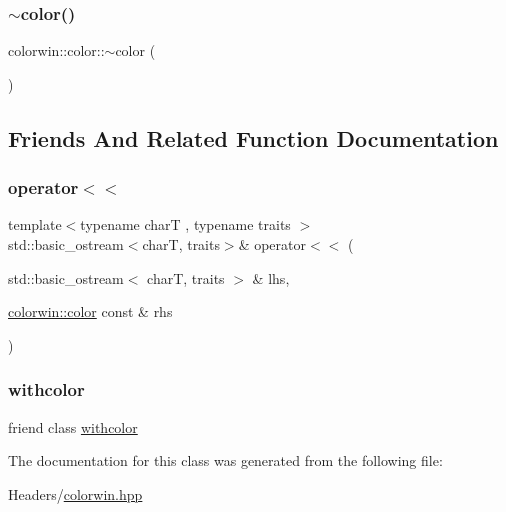 \mbox{\label{classcolorwin_1_1color_aae17b4c7bf1c06bb5045a4eedc6c8301}} 
\subsubsection{\texorpdfstring{$\sim$color()}{~color()}}
{\footnotesize\ttfamily colorwin\+::color\+::$\sim$color (\begin{DoxyParamCaption}{ }\end{DoxyParamCaption})\hspace{0.3cm}{\ttfamily [inline]}}



\subsection{Friends And Related Function Documentation}
\mbox{\label{classcolorwin_1_1color_a91f8fd76f0843aa66acc62b67a105fc7}} 
\subsubsection{\texorpdfstring{operator$<$$<$}{operator<<}}
{\footnotesize\ttfamily template$<$typename charT , typename traits $>$ \\
std\+::basic\+\_\+ostream$<$charT, traits$>$\& operator$<$$<$ (\begin{DoxyParamCaption}\item[{std\+::basic\+\_\+ostream$<$ charT, traits $>$ \&}]{lhs,  }\item[{\hyperlink{classcolorwin_1_1color}{colorwin\+::color} const \&}]{rhs }\end{DoxyParamCaption})\hspace{0.3cm}{\ttfamily [friend]}}

\mbox{\label{classcolorwin_1_1color_ad638d9b6be1ba8bc574a7a58a748d2ca}} 
\subsubsection{\texorpdfstring{withcolor}{withcolor}}
{\footnotesize\ttfamily friend class \hyperlink{classcolorwin_1_1withcolor}{withcolor}\hspace{0.3cm}{\ttfamily [friend]}}



The documentation for this class was generated from the following file\+:\begin{DoxyCompactItemize}
\item 
Headers/\hyperlink{colorwin_8hpp}{colorwin.\+hpp}\end{DoxyCompactItemize}
